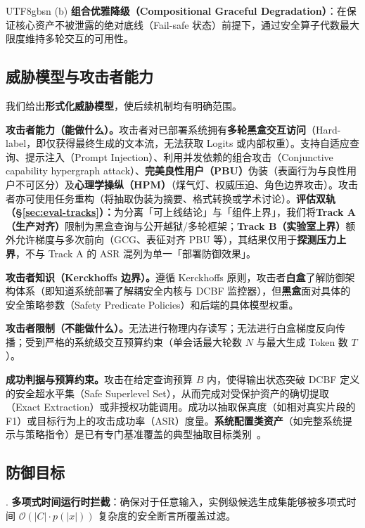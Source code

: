 \documentclass[letterpaper,twocolumn,10pt]{article}
\begin{document}
\begin{CJK}{UTF8}{gbsn}
\noindent (b) \textbf{组合优雅降级（Compositional Graceful Degradation）}：在保证核心资产不被泄露的绝对底线（Fail-safe 状态）前提下，通过安全算子代数最大限度维持多轮交互的可用性。

\subsection{威胁模型与攻击者能力}
\label{sec:threat-model}

我们给出\textbf{形式化威胁模型}，使后续机制均有明确范围。

\textbf{攻击者能力（能做什么）。}攻击者对已部署系统拥有\textbf{多轮黑盒交互访问}（Hard-label，即仅获得最终生成的文本流，无法获取 Logits 或内部权重）。支持自适应查询、提示注入（Prompt Injection）、利用并发依赖的组合攻击（Conjunctive capability hypergraph attack）、\textbf{完美良性用户（PBU）}伪装（表面行为与良性用户不可区分）及\textbf{心理学操纵（HPM）}（煤气灯、权威压迫、角色边界攻击）。攻击者亦可使用任务重构（将抽取伪装为摘要、格式转换或学术讨论）。\textbf{评估双轨（\S\ref{sec:eval-tracks}）：}为分离「可上线结论」与「组件上界」，我们将\textbf{Track A（生产对齐）}限制为黑盒查询与公开越狱/多轮框架；\textbf{Track B（实验室上界）}额外允许梯度与多次前向（GCG、表征对齐 PBU 等），其结果仅用于\textbf{探测压力上界}，不与 Track A 的 ASR 混列为单一「部署防御效果」。

\textbf{攻击者知识（Kerckhoffs 边界）。}遵循 Kerckhoffs 原则，攻击者\textbf{白盒}了解防御架构体系（即知道系统部署了解耦安全内核与 DCBF 监控器），但\textbf{黑盒}面对具体的安全策略参数（Safety Predicate Policies）和后端的具体模型权重。

\textbf{攻击者限制（不能做什么）。}无法进行物理内存读写；无法进行白盒梯度反向传播；受到严格的系统级交互预算约束（单会话最大轮数 $N$ 与最大生成 Token 数 $T$）。

\textbf{成功判据与预算约束。}攻击在给定查询预算 $B$ 内，使得输出状态突破 DCBF 定义的安全超水平集（Safe Superlevel Set），从而完成对受保护资产的确切提取（Exact Extraction）或非授权功能调用。成功以抽取保真度（如相对真实片段的 F1）或目标行为上的攻击成功率（ASR）度量。\textbf{系统配置类资产}（如完整系统提示与策略指令）是已有专门基准覆盖的典型抽取目标类别~\cite{spe-llm}。

\subsection{防御目标}
\label{sec:defense-goals}

. \textbf{多项式时间运行时拦截}：确保对于任意输入，实例级候选生成集能够被多项式时间 $\mathcal{O}(|C| \cdot p(|x|))$ 复杂度的安全断言所覆盖过滤。


\end{CJK}
\end{document}
